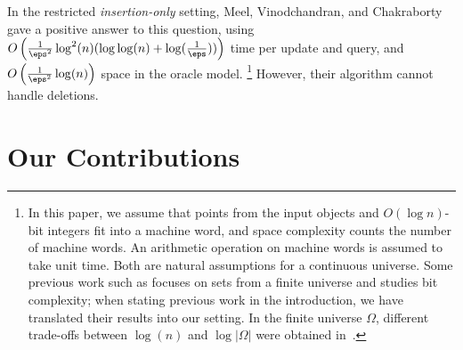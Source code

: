 %
In the restricted \emph{insertion-only} setting, Meel, Vinodchandran, and Chakraborty~\cite{MVC21} gave a positive answer to this question, using $O\left(\frac{1}{\eps^2} \log^2(n) (\log \log(n) + \log(\frac{1}{\eps})) \right)$ time per update and query, and $O\left( \frac{1}{\eps^2} \log(n) \right)$ space in the oracle model.%
\footnote{In this paper, we assume that points from the input objects and $O(\log n)$-bit integers fit into a machine word, and space complexity counts the number of machine words. An arithmetic operation on machine words is assumed to take unit time. Both are natural assumptions for a continuous universe. Some previous work such as \cite{MVC21} focuses on sets from a finite universe and studies bit complexity; when stating previous work in the introduction, we have translated their results into our setting. In the finite universe $\Omega$, different trade-offs between $\log(n)$ and $\log |\Omega|$ were obtained in~\cite{MCV22,NandiVGMP024}.}
However, their algorithm cannot handle deletions.
%
\section{Our Contributions}
%
